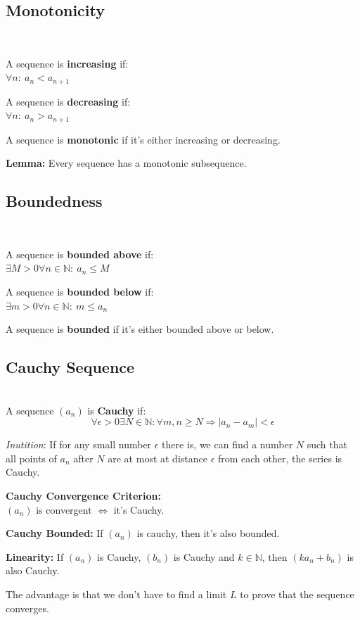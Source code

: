 \documentclass[8pt,a4paper]{extarticle}     %
\theoremstyle{definition}
\theoremstyle{definition}
\theoremstyle{definition}
\newcommand{\N}{\mathbb{N}}
\begin{document}
\begin{multicols}{4}
\subsection{Monotonicity}
\begin{boxdefinition} \ 
	\begin{bulletlist}		
		\item A sequence is \textbf{increasing} if: \\
		$\forall n:\ a_n < a_{n+1}$
		\item A sequence is \textbf{decreasing} if: \\
		$\forall n:\ a_n > a_{n+1}$
		\item A sequence is \textbf{monotonic} if it's either increasing or decreasing. 
	\end{bulletlist}
\end{boxdefinition}
\textbf{Lemma: } Every sequence has a monotonic subsequence.

\subsection{Boundedness}
\begin{boxdefinition} \ 
	\begin{bulletlist}		
		\item A sequence is \textbf{bounded above} if: \\ 
		$\exists M>0\forall n\in\N:\ a_n \leq M$ 
		\item A sequence is \textbf{bounded below} if: \\ 
		$\exists m>0\forall n\in\N:\ m \leq a_n$
		\item A sequence is \textbf{bounded} if it's either bounded above or below. 
	\end{bulletlist}
\end{boxdefinition}

\subsection{Cauchy Sequence}
\begin{boxdefinition}\ \\
	A sequence $(a_n)$ is \textbf{Cauchy} if: 
	$$\forall\epsilon >0\exists N\in\N: \forall m,n\geq N \Rightarrow |a_n-a_m| < \epsilon $$
\end{boxdefinition}
\textit{Inutition}: If for any small number $\epsilon$ there is, we can find a number $N$ such that all points of $a_n$ after $N$ are at most at distance $\epsilon$ from each other, the series is Cauchy. 
\begin{eqlist}
	\item \textbf{Cauchy Convergence Criterion:} \\ $(a_n)$ is convergent $\Leftrightarrow$ it's Cauchy. 
	\item \textbf{Cauchy Bounded:} If $(a_n)$ is cauchy, then it's also bounded. 
	\item \textbf{Linearity:} If $(a_n)$ is Cauchy, $(b_n)$ is Cauchy and $k\in\N$, then $(ka_n+b_n)$ is also Cauchy. 
\end{eqlist}
The advantage is that we don't have to find a limit $L$ to prove that the sequence converges. 


\end{multicols}
\end{document}
